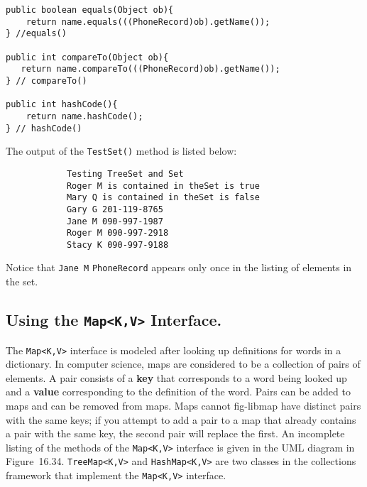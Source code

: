 \begin{jjjlisting}
\begin{lstlisting}
public boolean equals(Object ob){
    return name.equals(((PhoneRecord)ob).getName());
} //equals()

public int compareTo(Object ob){
   return name.compareTo(((PhoneRecord)ob).getName());
} // compareTo()

public int hashCode(){
    return name.hashCode();
} // hashCode()
\end{lstlisting}
\end{jjjlisting}

The output of the {\tt TestSet()} method is listed below:

\begin{jjjlisting}
\begin{lstlisting}
            Testing TreeSet and Set
            Roger M is contained in theSet is true
            Mary Q is contained in theSet is false
            Gary G 201-119-8765
            Jane M 090-997-1987
            Roger M 090-997-2918
            Stacy K 090-997-9188
\end{lstlisting}
\end{jjjlisting}

\noindent Notice that {\tt Jane M} {\tt PhoneRecord} appears only once in the
listing of elements in the set.

\subsection{Using the {\tt Map<K,V>} Interface.}

The {\tt Map<K,V>} interface is modeled after looking up definitions
for words in a dictionary. In computer science, maps are considered to
be a collection of pairs of elements. A pair consists of a {\bf key}
that corresponds to a word being looked up and a {\bf value}
corresponding to the definition of the word.  Pairs can be added to
maps and can be removed from maps. Maps cannot
{fig-libmap}
\noindent have distinct pairs with the same keys; if you attempt to add a pair
to a map that already contains a pair with the same key, the second
pair will replace the first.  An incomplete listing of the methods of
the {\tt Map<K,V>} interface is given in the UML diagram in
Figure~16.34.  {\tt TreeMap<K,V>} and {\tt HashMap<K,V>} are two
classes in the collections framework that implement the {\tt Map<K,V>}
interface.

